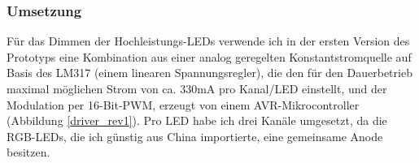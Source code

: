 \documentclass[12pt,a4paper,notitlepage]{article}
\begin{document}
\subsubsection{Umsetzung}
Für das Dimmen der Hochleistungs-LEDs verwende ich in der ersten Version des Prototyps eine Kombination aus einer analog geregelten Konstantstromquelle auf Basis des LM317\cite{NATIONAL3} (einem linearen Spannungsregler), die den für den Dauerbetrieb maximal möglichen Strom von ca. 330mA pro Kanal/LED einstellt, und der Modulation per 16-Bit-PWM, erzeugt von einem AVR-Mikrocontroller (Abbildung \ref{driver_rev1}).
Pro LED habe ich drei Kanäle umgesetzt, da die RGB-LEDs, die ich günstig aus China importierte, %
eine gemeinsame Anode besitzen.

\begin{figure}
\centering
{}
\end{figure}
\end{document}
